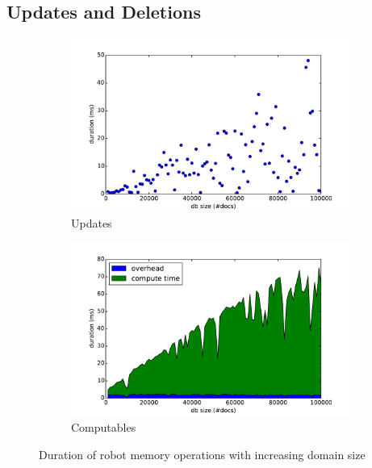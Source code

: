\subsection{Updates and Deletions}
\label{sec:updates}
\begin{figure}
  \centering
  \begin{subfigure}[b]{0.49\textwidth}
    \includegraphics[width=\textwidth]{plots/update-durations}
    \caption{Updates}
    \label{fig:update-durations}
  \end{subfigure}
  \begin{subfigure}[b]{0.49\textwidth}
    \includegraphics[width=\textwidth]{plots/computable-durations}
    \caption{Computables}
    \label{fig:computable-durations}
  \end{subfigure}
  \caption[Duration of robot memory operations with increasing domain size]{Duration of robot memory operations with increasing domain size}
  \label{fig:eval-durations-2}
\end{figure}

